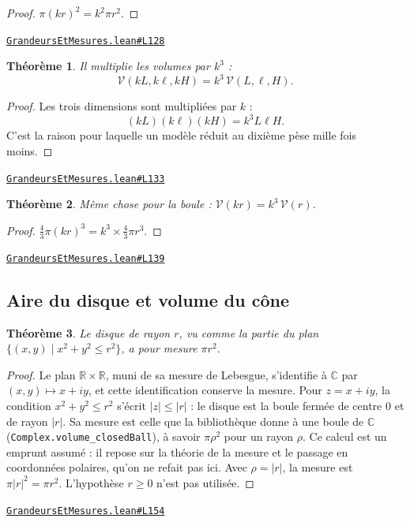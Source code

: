 \documentclass[11pt,a4paper]{article}
\theoremstyle{definition}
\theoremstyle{plain}
\newtheorem{theoreme}{Théorème}
\newcommand{\source}[2]{\par\smallskip\noindent\hfill{\footnotesize\href{#1}{\texttt{#2}}}\par\smallskip}
\begin{document}
\begin{proof}
$\pi (kr)^2 = k^2 \pi r^2$.
\end{proof}
\source{https://github.com/Commutator-IO/learn-lean/blob/main/courses/01-college/04-grandeurs-et-mesures/GrandeursEtMesures.lean\#L128}{GrandeursEtMesures.lean\#L128}

\begin{theoreme}
Il multiplie les volumes par $k^3$ :
\[ \mathcal{V}(kL, k\ell, kH) = k^3\,\mathcal{V}(L, \ell, H) . \]
\end{theoreme}

\begin{proof}
Les trois dimensions sont multipliées par $k$ :
\[ (kL)(k\ell)(kH) = k^3 L\ell H . \]
C'est la raison pour laquelle un modèle réduit au dixième pèse mille fois moins.
\end{proof}
\source{https://github.com/Commutator-IO/learn-lean/blob/main/courses/01-college/04-grandeurs-et-mesures/GrandeursEtMesures.lean\#L133}{GrandeursEtMesures.lean\#L133}

\begin{theoreme}
Même chose pour la boule : $\mathcal{V}(kr) = k^3\,\mathcal{V}(r)$.
\end{theoreme}

\begin{proof}
$\tfrac43 \pi (kr)^3 = k^3 \times \tfrac43 \pi r^3$.
\end{proof}
\source{https://github.com/Commutator-IO/learn-lean/blob/main/courses/01-college/04-grandeurs-et-mesures/GrandeursEtMesures.lean\#L139}{GrandeursEtMesures.lean\#L139}

\subsection{Aire du disque et volume du cône}
\begin{theoreme}
Le disque de rayon $r$, vu comme la partie du plan $\{(x, y) \mid x^2 + y^2 \le r^2\}$,
a pour mesure $\pi r^2$.
\end{theoreme}
\begin{proof}
Le plan $\mathbb{R} \times \mathbb{R}$, muni de sa mesure de Lebesgue, s'identifie à
$\mathbb{C}$ par $(x, y) \mapsto x + iy$, et cette identification conserve la mesure.
Pour $z = x + iy$, la condition $x^2 + y^2 \le r^2$ s'écrit $|z| \le |r|$ : le disque est la
boule fermée de centre $0$ et de rayon $|r|$. Sa mesure est celle que la bibliothèque donne
à une boule de $\mathbb{C}$ (\texttt{Complex.volume\_closedBall}), à savoir $\pi \rho^2$ pour
un rayon $\rho$. Ce calcul est un emprunt assumé : il repose sur la théorie de la mesure
et le passage en coordonnées polaires, qu'on ne refait pas ici. Avec $\rho = |r|$, la mesure
est $\pi |r|^2 = \pi r^2$. L'hypothèse $r \ge 0$ n'est pas utilisée.
\end{proof}
\source{https://github.com/Commutator-IO/learn-lean/blob/main/courses/01-college/04-grandeurs-et-mesures/GrandeursEtMesures.lean\#L154}{GrandeursEtMesures.lean\#L154}
\end{document}
